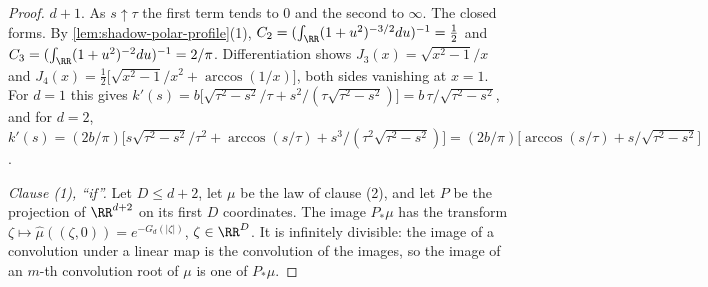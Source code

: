 \begin{proof}
$d + 1$. As $s \uparrow \tau$ the first term tends to $0$ and the second to $\infty$. The closed
forms. By \ref{lem:shadow-polar-profile}(1), $C_2 = (\int_{\RR}(1+u^2)^{-3/2}du)^{-1} = \tfrac12$
and $C_3 = (\int_{\RR}(1+u^2)^{-2}du)^{-1} = 2/\pi$. Differentiation shows
$J_3(x) = \sqrt{x^2-1}/x$ and $J_4(x) = \tfrac12\bigl[\sqrt{x^2-1}/x^2 + \arccos(1/x)\bigr]$,
both sides vanishing at $x = 1$. For $d = 1$ this gives
$k'(s) = b\bigl[\sqrt{\tau^2-s^2}/\tau + s^2/(\tau\sqrt{\tau^2-s^2})\bigr]
= b\,\tau/\sqrt{\tau^2-s^2}$, and for $d = 2$,
$k'(s) = (2b/\pi)\bigl[s\sqrt{\tau^2-s^2}/\tau^2 + \arccos(s/\tau)
+ s^3/(\tau^2\sqrt{\tau^2-s^2})\bigr] = (2b/\pi)\bigl[\arccos(s/\tau) + s/\sqrt{\tau^2-s^2}\bigr]$.

\emph{Clause (1), ``if''.} Let $D \le d + 2$, let $\mu$ be the law of clause (2), and let $P$ be
the projection of $\RR^{d+2}$ on its first $D$ coordinates. The image $P_*\mu$ has the transform
$\zeta \mapsto \widehat\mu((\zeta,0)) = e^{-G_d(|\zeta|)}$, $\zeta \in \RR^D$. It is infinitely
divisible: the image of a convolution under a linear map is the convolution of the images, so
the image of an $m$-th convolution root of $\mu$ is one of $P_*\mu$.


\end{proof}
